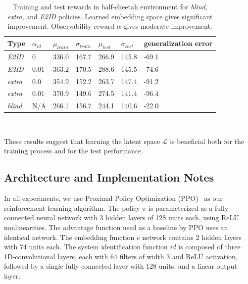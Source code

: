 \documentclass{article}
\newcommand{\cL}{\mathcal{L}}
\newcommand{\blind}{\emph{blind}}
\newcommand{\extra}{\emph{extra}}
\newcommand{\embed}{\emph{E2ID}}
\newcommand{\embedfn}{e}
\newcommand{\idfn}{id}
\newcommand{\latent}{\cL}
\begin{document}
\begin{table}[ht]
\centering
\begin{tabular}{l l l l l l l}
Type & $\alpha_{id}$ & $\mu_{train}$ & $\sigma_{train}$& $\mu_{test}$ & $\sigma_{test}$ & generalization error \\
\hline
\embed{} & 0 & 336.0 & 167.7 & 266.9 & 145.8 & -69.1 \\
\embed{} & 0.01 & 363.2 & 170.5 & 288.6 & 145.5 & -74.6 \\
\extra{} & 0.0 & 354.9 & 152.2  & 263.7 & 147.4 & -91.2 \\
\extra{} & 0.01 & 370.9 & 149.6 & 274.5 & 141.4 & -96.4 \\
\blind{} & N/A & 266.1 & 156.7 & 244.1 & 140.6 & -22.0
\end{tabular}

\vspace{0.4cm} \\

\caption{
Training and test rewards in half-cheetah environment for \blind{}, \extra{}, and \embed{} policies.
Learned embedding space gives significant improvement.
Observability reward $\alpha$ gives moderate improvement.
}
\label{cheetah}
\end{table}

These results suggest that learning the latent space $\latent$ is beneficial
both for the training process and for the test performance.


\subsection{Architecture and Implementation Notes}
\label{implementation}
In all experiments, we use Proximal Policy Optimization (PPO)~\citep{schulman-ppo} as our reinforcement learning algorithm.
The policy $\pi$ is parameterized as a fully connected neural network with 3 hidden layers of 128 units each, using ReLU nonlinearities.
The advantage function used as a baseline by PPO uses an identical network.
The embedding function $\embedfn$ network contains 2 hidden layers with 74 units each.
The system identification function $\idfn$ is composed of three 1D-convolutional layers, each with 64 filters of width 3 and ReLU activation, followed by a single fully connected layer with 128 units, and a linear output layer.
\end{document}
